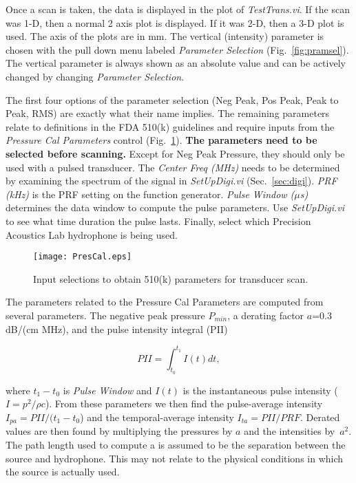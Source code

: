 \documentclass[10pt]{article}
\begin{document}
Once a scan is taken, the data is displayed in the plot of {\it
TestTrans.vi}. If the scan was 1-D, then a normal 2 axis plot is
displayed. If it was 2-D, then a 3-D plot is used. The axis of the
plots are in mm. The vertical (intensity) parameter is chosen with
the pull down menu labeled {\it Parameter Selection}
(Fig.~\ref{fig:pramsel}). The vertical parameter is always shown
as an absolute value and can be actively changed by changing {\it
Parameter Selection}.

The first four options of the parameter selection (Neg Peak, Pos
Peak, Peak to Peak, RMS) are exactly what their name implies. The
remaining parameters relate to definitions in the FDA 510(k)
guidelines and require inputs from the {\it Pressure Cal
Parameters} control (Fig.~\ref{fig:PresCal}). {\bf The parameters
need to be selected before scanning.} Except for Neg Peak
Pressure, they should only be used with a pulsed transducer. The
{\it Center Freq (MHz)} needs to be determined by examining the
spectrum of the signal in {\it SetUpDigi.vi}
(Sec.~\ref{sec:digi}). {\it PRF (kHz)} is the PRF setting on the
function generator. {\it Pulse Window ($\mu$s)} determines the
data window to compute the pulse parameters. Use {\it
SetUpDigi.vi} to see what time duration the pulse lasts. Finally,
select which Precision Acoustics Lab hydrophone is being used.

\begin{figure}[!htb]
\begin{center}
\texttt{[image: PresCal.eps]}
 \caption{Input selections to obtain 510(k) parameters for transducer
 scan. }
 \label{fig:PresCal}
\end{center}
\end{figure}

The parameters related to the Pressure Cal Parameters are computed
from several parameters. The negative peak pressure $P_{min}$, a
derating factor $a$=0.3 dB/(cm MHz), and the pulse intensity
integral (PII)

\begin{equation}\label{eq:Pgas}
  PII=\int_{t_{0}}^{t_{1}}I(t) dt,
\end{equation}

where $t_{1}-t_{0}$ is {\it Pulse Window} and $I(t)$ is the
instantaneous pulse intensity ($I=p^{2}/\rho c$). From these
parameters we then find the pulse-average intensity
$I_{pa}=PII/(t_{1}-t_{0}$) and the temporal-average intensity
$I_{ta}=PII/PRF$. Derated values are then found by multiplying the
pressures by $a$ and the intensities by~$a^{2}$. The path length
used to compute a is assumed to be the separation between the
source and hydrophone. This may not relate to the physical
conditions in which the source is actually used.
\end{document}
